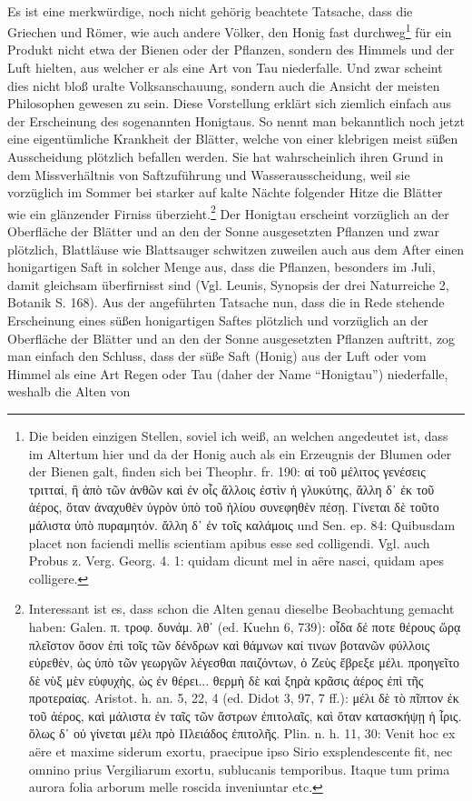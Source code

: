 \documentclass[a4paper, 11pt, oneside]{article}
\begin{document}
\paragraph{}
Es ist eine merkwürdige, noch nicht gehörig beachtete Tatsache, dass die Griechen und Römer, wie auch andere Völker, den Honig fast durchweg\footnote{Die beiden einzigen Stellen, soviel ich weiß, an welchen angedeutet ist, dass im Altertum hier und da der Honig auch als ein Erzeugnis der Blumen oder der Bienen galt, finden sich bei Theophr. fr. 190: αἱ τοῦ μέλιτος γενέσεις τριτταί, ἢ ἀπὸ τῶν ἀνθῶν καὶ ἐν οἷς ἄλλοις ἐστὶν ἡ γλυκύτης, ἄλλη δ᾽ ἐκ τοῦ ἀέρος, ὅταν ἀναχυθὲν ὑγρὸν ὑπὸ τοῦ ἡλίου συνεφηθὲν πέσῃ. Γίνεται δὲ τοῦτο μάλιστα ὑπὸ πυραμητόν. ἄλλη δ᾽ ἐν τοῖς καλάμοις und Sen. ep. 84: Quibusdam placet non faciendi mellis scientiam apibus esse sed colligendi. Vgl. auch Probus z. Verg. Georg. 4. 1: quidam dicunt mel in aëre nasci, quidam apes colligere.} für ein Produkt nicht etwa der Bienen oder der Pflanzen, sondern des Himmels und der Luft hielten, aus welcher er als eine Art von Tau niederfalle. Und zwar scheint dies nicht bloß uralte Volksanschauung, sondern auch die Ansicht der meisten Philosophen gewesen zu sein. Diese Vorstellung erklärt sich ziemlich einfach aus der Erscheinung des sogenannten Honigtaus. So nennt man bekanntlich noch jetzt eine eigentümliche Krankheit der Blätter, welche von einer klebrigen meist süßen Ausscheidung plötzlich befallen werden. Sie hat wahrscheinlich ihren Grund in dem Missverhältnis von Saftzuführung und Wasserausscheidung, weil sie vorzüglich im Sommer bei starker auf kalte Nächte folgender Hitze die Blätter wie ein glänzender Firniss überzieht.\footnote{Interessant ist es, dass schon die Alten genau dieselbe Beobachtung gemacht haben: Galen. π. τροφ. δυνάμ. λθ᾽ (ed. Kuehn 6, 739): οἷδα δέ ποτε θέρους ὥρᾳ πλεῖστον ὅσον ἐπὶ τοῖς τῶν δένδρων καὶ θάμνων καί τινων βοτανῶν φύλλοις εὐρεθὲν, ὡς ὑπὸ τῶν γεωργῶν λέγεσθαι παιζόντων, ὀ Ζεὺς ἔβρεξε μέλι. προηγεῖτο δὲ νὺξ μὲν εὐφυχὴς, ὡς ἐν θέρει... θερμὴ δὲ καὶ ξηρὰ κρᾶσις ἀέρος ἐπὶ τῆς προτεραίας. Aristot. h. an. 5, 22, 4 (ed. Didot 3, 97, 7 ff.): μέλι δὲ τὸ πῖπτον ἐκ τοῦ ἀέρος, καὶ μάλιστα ἐν ταῖς τῶν ἄστρων ἐπιτολαῖς, καὶ ὅταν κατασκήψῃ ἡ ἶρις. ὅλως δ᾽ οὐ γίνεται μέλι πρὸ Πλειάδος ἐπιτολῆς. Plin. n. h. 11, 30: Venit hoc ex aëre et maxime siderum exortu, praecipue ipso Sirio exsplendescente fit, nec omnino prius Vergiliarum exortu, sublucanis temporibus. Itaque tum prima aurora folia arborum melle roscida inveniuntar etc.} Der Honigtau erscheint vorzüglich an der Oberfläche der Blätter und an den der Sonne ausgesetzten Pflanzen und zwar plötzlich, Blattläuse wie Blattsauger schwitzen zuweilen auch aus dem After einen honigartigen Saft in solcher Menge aus, dass die Pflanzen, besonders im Juli, damit gleichsam überfirnisst sind (Vgl. Leunis, Synopsis der drei Naturreiche 2, Botanik S. 168). Aus der angeführten Tatsache nun, dass die in Rede stehende Erscheinung eines süßen honigartigen Saftes plötzlich und vorzüglich an der Oberfläche der Blätter und an den der Sonne ausgesetzten Pflanzen auftritt, zog man einfach den Schluss, dass der süße Saft (Honig) aus der Luft oder vom Himmel als eine Art Regen oder Tau (daher der Name "`Honigtau"') niederfalle, weshalb die Alten von 
\end{document}
